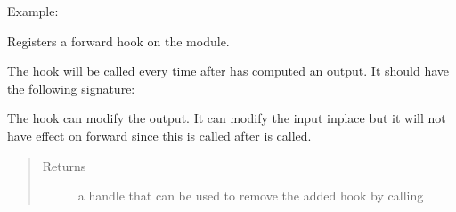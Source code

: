 \documentclass[letterpaper,10pt,english]{sphinxmanual}
\begin{document}
\begin{fulllineitems}
\begin{fulllineitems}
\begin{quote}
\begin{description}
\begin{itemize}
\end{itemize}

\end{description}\end{quote}

Example:

\begin{sphinxVerbatim}[commandchars=\\\{\}]
 
\end{sphinxVerbatim}

\end{fulllineitems}


\begin{fulllineitems}
\label{\detokenize{api/dynamics:geology.metamodelling.dynamics.NeuralDifferentialEquation.register_forward_hook}}
Registers a forward hook on the module.

The hook will be called every time after {\hyperref[\detokenize{api/dynamics:geology.metamodelling.dynamics.NeuralDifferentialEquation.forward}]{}} has computed an output.
It should have the following signature:

\begin{sphinxVerbatim}[commandchars=\\\{\}]
       
\end{sphinxVerbatim}

The hook can modify the output. It can modify the input inplace but
it will not have effect on forward since this is called after
{\hyperref[\detokenize{api/dynamics:geology.metamodelling.dynamics.NeuralDifferentialEquation.forward}]{}} is called.
\begin{quote}\begin{description}
\item[{Returns}] \leavevmode
a handle that can be used to remove the added hook by calling


\end{description}
\end{quote}
\end{fulllineitems}
\end{fulllineitems}
\end{document}
